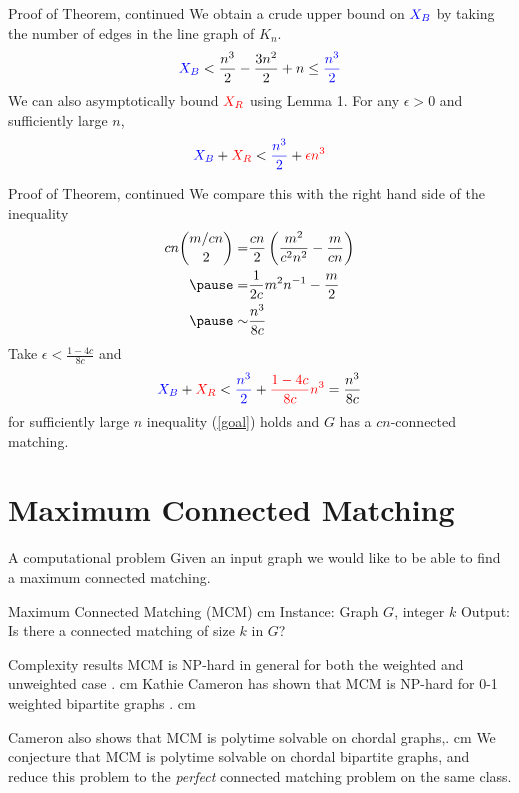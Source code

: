 \documentclass{beamer}
\newcommand{\bframe}[2]{\begin{frame}{#1}#2\end{frame}}
\begin{document}
\bframe{Proof of Theorem, continued}{
We obtain a crude upper bound on ${\color{blue}X_B}$ by taking the number of edges in the line graph of $K_n$. \pause
\begin{equation}
	{\color{blue}X_B} < \frac{n^3}{2} - \frac{3n^2}{2} + n \leq {\color{blue} \frac{n^3}{2}}
\end{equation}\pause
We can also asymptotically bound ${\color{red}X_R}$ using Lemma 1.  \pause For any $\epsilon > 0$ and sufficiently large $n$,\pause  \[{\color{blue}X_B} + {\color{red}X_R} < {\color{blue}\frac{n^3}{2}} +{\color{red} \epsilon n^3}\]
}

\bframe{Proof of Theorem, continued}{
We compare this with the right hand side of the inequality\pause
\begin{eqnarray}
	cn{m/cn\choose 2} =&\displaystyle \frac{cn}{2}\left(\frac{m^2}{c^2n^2} - \frac{m}{cn}\right)\\ \pause
	=& \displaystyle \frac{1}{2c}m^2n^{-1} - \frac{m}{2}\\ \pause
	\sim&   \displaystyle \frac{n^3}{8c}
\end{eqnarray}\pause
Take $\epsilon < \frac{1-4c}{8c}$ and \pause 
\[{\color{blue}X_B} + {\color{red}X_R} < {\color{blue}\frac{n^3}{2}} +{\color{red}\frac{1-4c}{8c}n^3} =\frac{n^3}{8c} \] \pause for sufficiently large $n$ inequality (\ref{goal}) holds and $G$ has a $cn$-connected matching.
}


\section{Maximum Connected Matching}

\bframe{A computational problem}{
	Given an input graph we would like to be able to find a maximum connected matching.\pause
 	\begin{framed}
  		Maximum Connected Matching (MCM)
  		\vskip 0.25 cm Instance: Graph $G$, integer $k$
  		\newline Output: Is there a connected matching of size $k$ in $G$?
 	\end{framed}
}

\bframe{Complexity results}{
	MCM is NP-hard in general for both the weighted and unweighted case \cite{MR2070161}. \pause\vskip 0.5 cm
	 Kathie Cameron has shown that MCM is NP-hard for 0-1 weighted bipartite graphs \cite{MR2163948}.\pause\vskip 0.5 cm
	
	Cameron also shows that MCM is polytime solvable on chordal graphs,.\pause \vskip 0.5 cm
 	We conjecture that MCM is polytime solvable on chordal bipartite graphs, and reduce this problem to the {\it perfect} connected matching problem on the same class.}
	 
\end{document}
